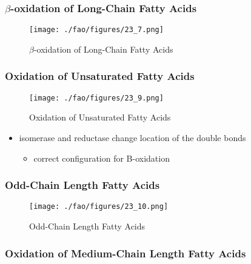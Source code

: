 \documentclass{scrartcl}
\begin{document}
\subsubsection{\(\beta\)-oxidation of Long-Chain Fatty Acids}
\label{sec:org87d57d3}
\begin{figure}[htbp]
\centering
\texttt{[image: ./fao/figures/23\_7.png]}
\caption{\label{fig:org3217120}
\(\beta\)-oxidation of Long-Chain Fatty Acids}
\end{figure}

\subsubsection{Oxidation of Unsaturated Fatty Acids}
\label{sec:orgf8abf65}

\begin{figure}[htbp]
\centering
\texttt{[image: ./fao/figures/23\_9.png]}
\caption{\label{fig:org3ce8180}
Oxidation of Unsaturated Fatty Acids}
\end{figure}

\begin{itemize}
\item isomerase and reductase change location of the double bonds
\begin{itemize}
\item correct configuration for B-oxidation
\end{itemize}
\end{itemize}
\subsubsection{Odd-Chain Length Fatty Acids}
\label{sec:orgf6d2b3f}
\begin{figure}[htbp]
\centering
\texttt{[image: ./fao/figures/23\_10.png]}
\caption{\label{fig:org23b48e3}
Odd-Chain Length Fatty Acids}
\end{figure}

\subsubsection{Oxidation of Medium-Chain Length Fatty Acids}
\label{sec:orgecc3255}
\end{document}
